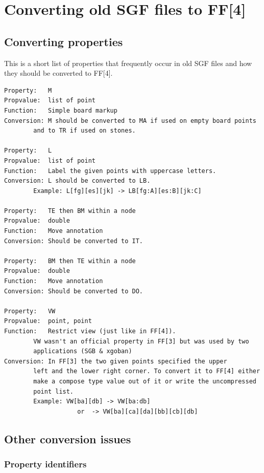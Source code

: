 \newpage

\section{Converting old SGF files to
FF{[}4{]}}\label{converting-old-sgf-files-to-ff4}

\subsection{Converting properties}\label{converting-properties}

This is a short list of properties that frequently occur in old SGF
files and how they should be converted to FF{[}4{]}.

\begin{verbatim}
Property:   M
Propvalue:  list of point
Function:   Simple board markup
Conversion: M should be converted to MA if used on empty board points
        and to TR if used on stones.

Property:   L
Propvalue:  list of point
Function:   Label the given points with uppercase letters.
Conversion: L should be converted to LB.
        Example: L[fg][es][jk] -> LB[fg:A][es:B][jk:C]

Property:   TE then BM within a node
Propvalue:  double
Function:   Move annotation
Conversion: Should be converted to IT.

Property:   BM then TE within a node
Propvalue:  double
Function:   Move annotation
Conversion: Should be converted to DO.

Property:   VW
Propvalue:  point, point
Function:   Restrict view (just like in FF[4]).
        VW wasn't an official property in FF[3] but was used by two
        applications (SGB & xgoban)
Conversion: In FF[3] the two given points specified the upper
        left and the lower right corner. To convert it to FF[4] either
        make a compose type value out of it or write the uncompressed
        point list.
        Example: VW[ba][db] -> VW[ba:db]
                    or  -> VW[ba][ca][da][bb][cb][db]
\end{verbatim}

\subsection{Other conversion issues}\label{other-conversion-issues}

\subsubsection{Property identifiers}\label{property-identifiers}

